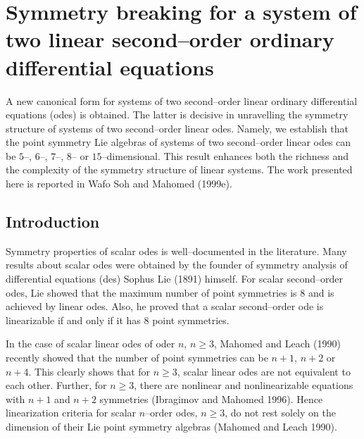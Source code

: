 %

\chapter{Symmetry breaking for a system of two linear second--order ordinary
differential equations}

A new canonical form for systems of two second--order linear ordinary
differential equations (odes) is obtained. The latter is decisive in
unravelling the symmetry structure of systems of two second--order linear odes.
Namely, we establish that the point symmetry Lie algebras of systems of two
second--order linear odes can be $5$--, $6$--, $7$--, $8$-- or
$15$--dimensional. This result enhances both the richness and the complexity
of the symmetry structure of linear systems. The work presented here
is reported in Wafo Soh and Mahomed (1999e).

\section{Introduction}
Symmetry properties of scalar odes is well--documented in the literature.
Many results about scalar odes were obtained by the founder of symmetry
analysis of differential equations (des) Sophus Lie (1891) himself.
For scalar  second--order odes, Lie showed that the maximum number
of point symmetries is $8$ and is achieved by linear odes.
Also, he proved that a scalar second--order ode is linearizable
if and only if it has $8$ point symmetries.

In the case of scalar linear odes of oder $n$, $n\ge 3$, Mahomed and Leach
(1990) recently showed that the number of point symmetries can be $n+1$,
$n+2$ or $n+4$. This clearly shows that for $n\ge 3$, scalar linear odes are
not equivalent to each other. Further, for $n\ge 3$, there are nonlinear
and nonlinearizable equations with $n+1$ and $n+2$ symmetries
(Ibragimov and Mahomed 1996).
Hence linearization criteria for scalar $n$--order odes, $n\ge 3$, do not
rest solely on the dimension of their Lie point symmetry  algebras
(Mahomed and Leach 1990).

